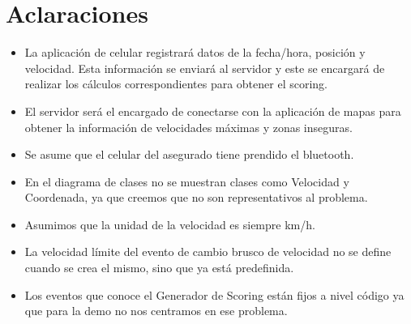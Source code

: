 \section{Aclaraciones}

\begin{itemize}
\item La aplicación de celular registrará datos de la fecha/hora, posición y velocidad. Esta información se enviará al servidor y este se encargará de realizar los cálculos correspondientes para obtener el scoring.
\item El servidor será el encargado de conectarse con la aplicación de mapas para obtener la información de velocidades máximas y zonas inseguras.
\item Se asume que el celular del asegurado tiene prendido el bluetooth.
\item En el diagrama de clases no se muestran clases como Velocidad y Coordenada, ya que creemos que no son representativos al problema.
\item Asumimos que la unidad de la velocidad es siempre km/h.
\item La velocidad límite del evento de cambio brusco de velocidad no se define cuando se crea el mismo, sino que ya está predefinida.
\item Los eventos que conoce el Generador de Scoring están fijos a nivel código ya que para la demo no nos centramos en ese problema.
\end{itemize}